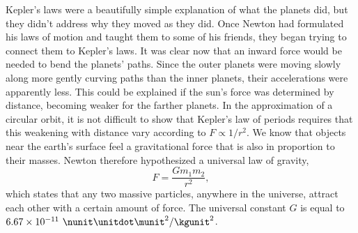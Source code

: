 Kepler's laws were a beautifully simple explanation of what the
planets did, but they didn't address why they moved as they did. Once
Newton had formulated his laws of motion and taught them to some of
his friends, they began trying to connect them to Kepler's laws. It
was clear now that an inward force would be needed to bend the
planets' paths.  Since the outer planets were moving slowly along more
gently curving paths than the inner planets, their accelerations were
apparently less. This could be explained if the sun's force was
determined by distance, becoming weaker for the farther planets.  In
the approximation of a circular orbit, it is not difficult to show
that Kepler's law of periods requires that this weakening with distance
vary according to $F\propto 1/r^2$. We know that objects near the earth's
surface feel a gravitational force that is also in proportion to their masses.
Newton therefore hypothesized a universal law of gravity,
\begin{equation*}
  F  =  \frac{Gm_1m_2}{r^2},
\end{equation*}
which states that any two massive particles, anywhere in the universe, attract each other
with a certain amount of force. The universal constant $G$
is equal to $6.67\times10^{-11}\ \nunit\unitdot\munit^2/\kgunit^2$.
